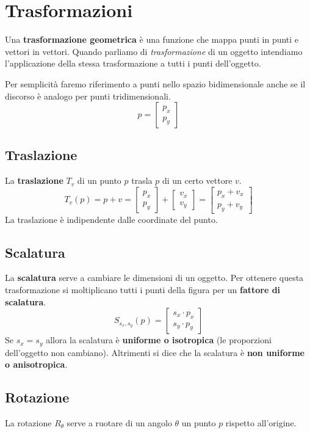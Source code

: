 \chapter{Trasformazioni}\label{trasformazioni}
Una \textbf{trasformazione geometrica} \`e una funzione che mappa punti in punti e vettori in vettori. Quando parliamo
di \emph{trasformazione} di un oggetto intendiamo l'applicazione della stessa trasformazione a tutti i punti
dell'oggetto.

Per semplicit\`a faremo riferimento a punti nello spazio bidimensionale anche se il discorso \`e analogo per punti
tridimensionali.
\[ p = \begin{bmatrix} p_x \\ p_y \end{bmatrix} \]

\section{Traslazione}
La \textbf{traslazione} $T_v$ di un punto $p$ trasla $p$ di un certo vettore $v$.
\[
	T_v(p) = p + v =
	\begin{bmatrix}
		p_x \\ p_y
	\end{bmatrix} +
	\begin{bmatrix}
		v_x \\ v_y
	\end{bmatrix} =
	\begin{bmatrix}
		p_x + v_x \\ p_y + v_y
	\end{bmatrix}
\]
La traslazione \`e indipendente dalle coordinate del punto.

\section{Scalatura}
La \textbf{scalatura} serve a cambiare le dimensioni di un oggetto. Per ottenere questa trasformazione si moltiplicano
tutti i punti della figura per un \textbf{fattore di scalatura}.
\[
	S_{s_x, s_y}(p) =
	\begin{bmatrix}
		s_x \cdot p_x \\
		s_y \cdot p_y
	\end{bmatrix}
\]
Se $s_x = s_y$ allora la scalatura \`e \textbf{uniforme o isotropica} (le proporzioni
dell'oggetto non cambiano). Altrimenti si dice che la scalatura \`e
\textbf{non uniforme o anisotropica}.

\section{Rotazione}
La rotazione $R_\theta$ serve a ruotare di un angolo $\theta$ un punto $p$ rispetto all'origine.

